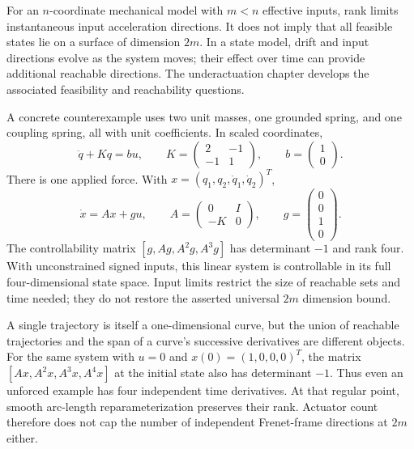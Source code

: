 \documentclass[12pt, openany]{book}
\theoremstyle{plain}
\begin{document}
For an $n$-coordinate mechanical model with $m<n$ effective inputs, rank limits
instantaneous input acceleration directions. It does not imply that all feasible
states lie on a surface of dimension $2m$. In a state model, drift and input
directions evolve as the system moves; their effect over time can provide
additional reachable directions. The underactuation chapter develops the
associated feasibility and reachability questions.

A concrete counterexample uses two unit masses, one grounded spring, and one
coupling spring, all with unit coefficients. In scaled coordinates,
\begin{equation}
 \ddot q+Kq=bu,\qquad
 K=\begin{pmatrix}2&-1\\-1&1\end{pmatrix},\qquad
 b=\begin{pmatrix}1\\0\end{pmatrix}.
 \label{eq:motion_coupled_springs}
\end{equation}
There is one applied force. With $x=(q_1,q_2,\dot q_1,\dot q_2)^T$,
\begin{equation}
 \dot x=Ax+gu,\qquad
 A=\begin{pmatrix}0&I\\-K&0\end{pmatrix},\qquad
 g=\begin{pmatrix}0\\0\\1\\0\end{pmatrix}.
 \label{eq:motion_spring_state}
\end{equation}
The controllability matrix $[g,Ag,A^2g,A^3g]$ has determinant $-1$ and rank
four. With unconstrained signed inputs, this linear system is controllable in
its full four-dimensional state space. Input limits restrict the size of
reachable sets and time needed; they do not restore the asserted universal
$2m$ dimension bound.

A single trajectory is itself a one-dimensional curve, but the union of
reachable trajectories and the span of a curve's successive derivatives are
different objects. For the same system with $u=0$ and $x(0)=(1,0,0,0)^T$,
the matrix $[Ax,A^2x,A^3x,A^4x]$ at the initial state also has determinant
$-1$. Thus even an unforced example has four independent time derivatives.
At that regular point, smooth arc-length reparameterization preserves their
rank. Actuator count therefore does not cap the number of independent
Frenet-frame directions at $2m$ either.
\end{document}
